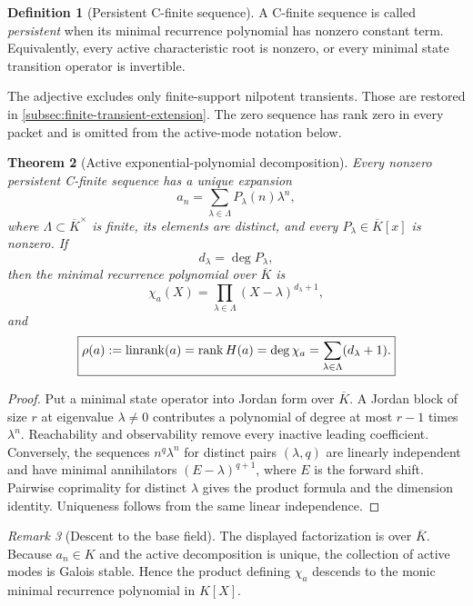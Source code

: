 \documentclass[11pt]{article}
\newtheorem{theorem}{Theorem}[section]\newtheorem{proposition}[theorem]{Proposition}\newtheorem{lemma}[theorem]{Lemma}\newtheorem{corollary}[theorem]{Corollary}
\theoremstyle{definition}\newtheorem{definition}[theorem]{Definition}\newtheorem{example}[theorem]{Example}\newtheorem{construction}[theorem]{Construction}\newtheorem{algorithm}[theorem]{Algorithm}\newtheorem{conjecture}[theorem]{Conjecture}\newtheorem{problem}[theorem]{Problem}
\theoremstyle{remark}\newtheorem{remark}[theorem]{Remark}\newtheorem{boundary}[theorem]{Boundary}\newtheorem{certificate}[theorem]{Computational Certificate}\newtheorem{classical}[theorem]{Classical Input}\newtheorem{principle}[theorem]{Structural Principle}
\begin{document}
\begin{definition}[Persistent C-finite sequence]
A C-finite sequence is called \emph{persistent} when its minimal recurrence polynomial has nonzero constant term.  Equivalently, every active characteristic root is nonzero, or every minimal state transition operator is invertible.
\end{definition}

The adjective excludes only finite-support nilpotent transients.  Those are restored in \cref{subsec:finite-transient-extension}.  The zero sequence has rank zero in every packet and is omitted from the active-mode notation below.

\begin{theorem}[Active exponential-polynomial decomposition]
\label{thm:active-modal-decomposition}
Every nonzero persistent C-finite sequence has a unique expansion
\[
 \boxed{
 a_n=\sum_{\lambda\in\Lambda}P_\lambda(n)\lambda^n,
 }
\]
where $\Lambda\subset\overline K^\times$ is finite, its elements are distinct, and every $P_\lambda\in\overline K[x]$ is nonzero.  If
\[
 d_\lambda=\deg P_\lambda,
\]
then the minimal recurrence polynomial over $\overline K$ is
\[
 \boxed{
 \chi_a(X)=\prod_{\lambda\in\Lambda}(X-\lambda)^{d_\lambda+1},
 }
\]
and
\[
 \boxed{
 \rho(a):=\operatorname{linrank}(a)
 =\operatorname{rank} H(a)
 =\deg\chi_a
 =\sum_{\lambda\in\Lambda}(d_\lambda+1).
 }
\]
\end{theorem}

\begin{proof}
Put a minimal state operator into Jordan form over $\overline K$.  A Jordan block of size $r$ at eigenvalue $\lambda\neq0$ contributes a polynomial of degree at most $r-1$ times $\lambda^n$.  Reachability and observability remove every inactive leading coefficient.  Conversely, the sequences $n^q\lambda^n$ for distinct pairs $(\lambda,q)$ are linearly independent and have minimal annihilators $(E-\lambda)^{q+1}$, where $E$ is the forward shift.  Pairwise coprimality for distinct $\lambda$ gives the product formula and the dimension identity.  Uniqueness follows from the same linear independence.
\end{proof}

\begin{remark}[Descent to the base field]
The displayed factorization is over $\overline K$.  Because $a_n\in K$ and the active decomposition is unique, the collection of active modes is Galois stable.  Hence the product defining $\chi_a$ descends to the monic minimal recurrence polynomial in $K[X]$.
\end{remark}
\end{document}
